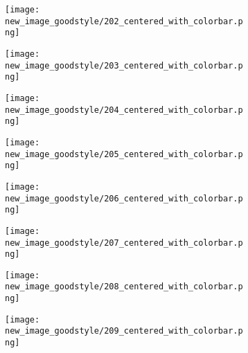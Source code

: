\documentclass[a4paper,12pt]{article}
\begin{document}
\begin{figure}[H]
  \begin{subfigure}{0.11\textwidth}
    \texttt{[image: new\_image\_goodstyle/202\_centered\_with\_colorbar.png]}
  \end{subfigure}
  \hfill
  \begin{subfigure}{0.11\textwidth}
    \texttt{[image: new\_image\_goodstyle/203\_centered\_with\_colorbar.png]}
  \end{subfigure}
  \hfill
  \begin{subfigure}{0.11\textwidth}
    \texttt{[image: new\_image\_goodstyle/204\_centered\_with\_colorbar.png]}
  \end{subfigure}
  \hfill
  \begin{subfigure}{0.11\textwidth}
    \texttt{[image: new\_image\_goodstyle/205\_centered\_with\_colorbar.png]}
  \end{subfigure}
  \hfill
  \begin{subfigure}{0.11\textwidth}
    \texttt{[image: new\_image\_goodstyle/206\_centered\_with\_colorbar.png]}
  \end{subfigure}
  \hfill
  \begin{subfigure}{0.11\textwidth}
    \texttt{[image: new\_image\_goodstyle/207\_centered\_with\_colorbar.png]}
  \end{subfigure}
  \hfill
  \begin{subfigure}{0.11\textwidth}
    \texttt{[image: new\_image\_goodstyle/208\_centered\_with\_colorbar.png]}
  \end{subfigure}
  \hfill
  \begin{subfigure}{0.11\textwidth}
    \texttt{[image: new\_image\_goodstyle/209\_centered\_with\_colorbar.png]}
  \end{subfigure}
  \hfill
\end{figure}
\end{document}

